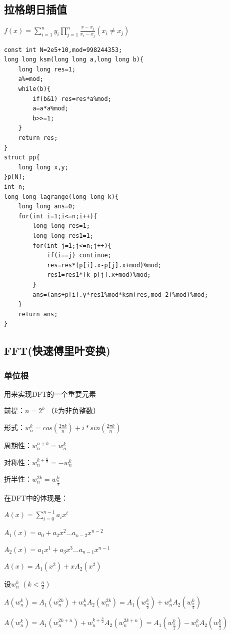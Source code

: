 \documentclass[12pt, a4paper, oneside]{ctexart}
\begin{document}
\newpage 
\subsection{拉格朗日插值} 
${f(x)=\sum_{i=1}^ny_i\prod_{j=1}^n\frac{x-x_j}{x_i-x_j}(x_i \neq x_j)}$
\begin{lstlisting}
const int N=2e5+10,mod=998244353;
long long ksm(long long a,long long b){
    long long res=1;
    a%=mod;
    while(b){
        if(b&1) res=res*a%mod;
        a=a*a%mod;
        b>>=1;
    }
    return res;
}
struct pp{
    long long x,y;
}p[N];
int n;
long long lagrange(long long k){
    long long ans=0;
    for(int i=1;i<=n;i++){
        long long res=1;
        long long res1=1;
        for(int j=1;j<=n;j++){
            if(i==j) continue;
            res=res*(p[i].x-p[j].x+mod)%mod;
            res1=res1*(k-p[j].x+mod)%mod;
        }
        ans=(ans+p[i].y*res1%mod*ksm(res,mod-2)%mod)%mod;
    }
    return ans;
}
\end{lstlisting}

\newpage 
\subsection{FFT(快速傅里叶变换)} 
\subsubsection{单位根}
用来实现DFT的一个重要元素

前提：${n=2^k}$ （${k}$为非负整数）

形式：${{w_n^k}={cos(\frac{2\pi k}{n})}+{i*sin(\frac{2\pi k}{n})}}$

周期性：${w_n^{n+k}=w_n^k}$

对称性：${w_n^{k+{\frac{n}{2}}}=-w_n^k}$

折半性：${w_n^{2k}=w_{\frac{n}{2}}^k}$

在DFT中的体现是：

${A(x)={\sum_{i=0}^{n-1}}}a_ix^i$

${A_1(x)=a_0+a_2x^2 ...a_{n-2}x^{n-2}}$

${A_2(x)=a_1x^1+a_3x^3...a_{n-1}x^{n-1}}$

${A(x)=A_1(x^2)+xA_2(x^2)}$

设${w_n^k}$ $({k}<{\frac{n}{2}})$

${A(w_n^k)=A_1(w_n^{2k})+{w_n^k}A_2(w_n^{2k})=A_1(w_{\frac{n}{2}}^k)+w_n^kA_2(w_{\frac{n}{2}}^k)}$

${A(w_n^k)=A_1(w_n^{2k+n})+{w_n^{k+{\frac{n}{2}}}}A_2(w_n^{2k+n})=A_1(w_{\frac{n}{2}}^k)-w_n^kA_2(w_{\frac{n}{2}}^k)}$
\end{document}
